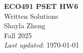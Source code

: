 \documentclass{article} %
\begin{document}
\clearpage 
\thispagestyle{empty} 

\vspace*{2em}
\begin{center}
    {\Large\bfseries ECO491 PSET HW6} \\
    \vspace{0.5em}
    {\Large Written Solutions} \\[2em] 
    {\large Shayla Zheng} \\[1em]
    {Fall 2025} \\ [1em]
    {\textit{Last updated}: \today}
\end{center}


\end{document}
